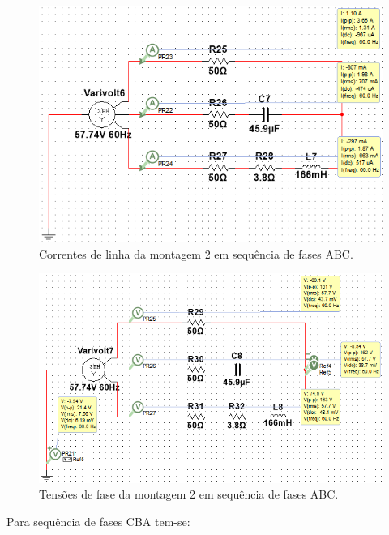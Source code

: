 \documentclass[a4paper,12pt,oneside,openany,table,xcdraw]{article}
\begin{document}
\begin{figure}[H]
\centering
\includegraphics[width=13.5cm]{m2-esquema-abc-correntes}
\caption{Correntes de linha da montagem 2 em sequência de fases ABC.}
\label{m2:IL}
\end{figure}
\begin{figure}[H]
\centering
\includegraphics[width=13.5cm]{m2-esquema-abc-vf}
\caption{Tensões de fase da montagem 2 em sequência de fases ABC.}
\label{m1:VF}
\end{figure}

\newpage
Para sequência de fases CBA tem-se: 
\end{document}
